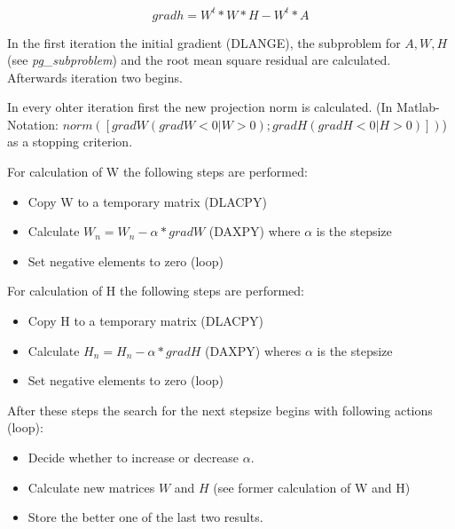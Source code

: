 \documentclass[a4paper,10pt]{scrartcl}
\begin{document}
					\begin{equation*}
						gradh = W^t * W * H - W^t * A
					\end{equation*}

					In the first iteration the initial gradient (DLANGE), the subproblem
					for $A, W, H$ (see \emph{pg\_subproblem}) and the root mean square
					residual are calculated.\newline
					Afterwards iteration two begins.\newline

					In every ohter iteration first the new projection norm is calculated. (In 
					Matlab-Notation: $norm([gradW(gradW <0 | W > 0); gradH(gradH <0 | H > 
					0)])$) as a stopping criterion.\newline

					For calculation of W the following steps are performed:\newline

					\begin{itemize}
					 \item Copy W to a temporary matrix (DLACPY)\newline
					 \item Calculate $W_n = W_n -\alpha * gradW$ (DAXPY) where $\alpha$ is the 
						stepsize\newline
					 \item Set negative elements to zero (loop)\newline
					\end{itemize}


					For calculation of H the following steps are performed:\newline
					
					\begin{itemize}
					 \item Copy H to a temporary matrix (DLACPY)\newline
					 \item Calculate $H_n = H_n -\alpha * gradH$ (DAXPY) wheres $\alpha$ is 
						the stepsize\newline
					 \item Set negative elements to zero (loop)\newline
					\end{itemize}

					After these steps the search for the next stepsize begins with following
					actions (loop):\newline

					\begin{itemize}
					 \item Decide whether to increase or decrease $\alpha$.\newline
					 \item Calculate new matrices $W$ and $H$ (see former calculation of W and 
						H)\newline
					 \item Store the better one of the last two results.\newline
					\end{itemize}
\end{document}
